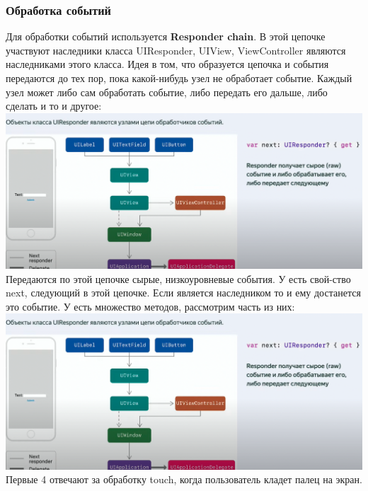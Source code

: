 \documentclass{article}
\begin{document}
    \subsubsection{Обработка событий}
    Для обработки событий используется \textbf{Responder chain}. В этой цепочке участвуют наследники класса UIResponder, UIView, ViewController являются наследниками этого класса. Идея в том, что образуется цепочка и события передаются до тех пор, пока какой-нибудь узел не обработает событие. Каждый узел может либо сам обработать событие, либо передать его дальше, либо сделать и то и другое:
    \newline
    \includegraphics[scale = 0.2]{pic/Снимок экрана 2023-08-01 в 00.21.24.png}
    \newline
    Передаются по этой цепочке сырые, низкоуровневые события. У  есть свой-ство next, следующий  в этой цепочке.
    \newline
    Если  является наследником  то и ему достанется это событие. 
    \newline
    У  есть множество методов, рассмотрим часть из них:
    \newline
    \includegraphics[scale = 0.3]{pic/Снимок экрана 2023-08-01 в 00.21.24.png}
    \newline
    Первые 4 отвечают за обработку touch, когда пользователь кладет палец на экран. 
\end{document}
